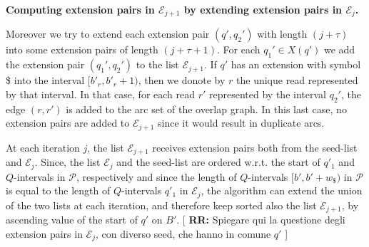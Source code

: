\documentclass[runningheads,envcountsame,a4paper]{llncs}
\newcommand{\notaestesa}[2]{%
 \marginpar{\color{red!75!black}\textbf{\texttimes}}%
 {\color{red!75!black}%
 [\,\textbullet\,\textsf{\textbf{#1:}} %
 \textsf{\footnotesize#2}\,\textbullet\,]}%
}
\newcommand{\ie}{\textit{i.e.}\xspace}
\begin{document}
\noindent
{\bf Computing  extension pairs in $\mathcal{E}_{j+1}$ by extending   extension pairs in $\mathcal{E}_{j}$.}

Moreover we try to extend each extension pair $(q', q_{2}')$ with length $(j+\tau)$ into some
extension pairs of length $(j+\tau+1)$.
For each $q_{1}'\in X(q')$ we add the extension pair  $(q_{1}',q_{2}')$ to
the list $\mathcal{E}_{j+1}$.
If  $q'$ has an  extension with symbol \$
into the interval $[b'_r, b'_r+1)$, then we donote by $r$ the unique  read represented by that
interval.
In that case, for   each read  $r'$ represented by the
interval $q_{2}'$, the edge $(r,r')$ is added to the arc set of the overlap graph.
In this last case, no extension pairs are added to $\mathcal{E}_{j+1}$ since it
would result in duplicate arcs.


At each iteration $j$, the list $\mathcal{E}_{j+1}$ receives extension
pairs both from the seed-list  and $\mathcal{E}_{j}$.
Since, the list  $\mathcal{E}_{j}$  and the seed-list are ordered w.r.t. the start of  $q'_1$ and $Q$-intervals in $\mathcal{P}$, respectively and since the  length of $Q$-intervals $[b', b'+w_\$)$ in $\mathcal{P}$ is
equal to the length  of  $Q$-intervals $q'_1$ in $\mathcal{E}_{j}$, the
algorithm can extend the union of the two lists at each iteration, and therefore keep
sorted also the list $\mathcal{E}_{j+1}$, by ascending value of the
start of $q'$ on $B'$.\notaestesa{RR}{Spiegare qui la questione degli extension pairs in $\mathcal{E}_j$, con diverso seed, che hanno in comune $q'$}




\end{document}

